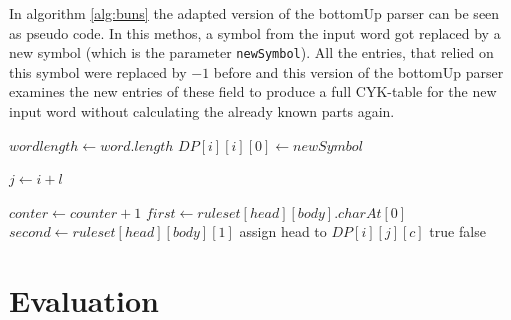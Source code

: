 \documentclass[a4paper, 11pt]{article}
\begin{document}
In algorithm \ref{alg:buns} the adapted version of the bottomUp parser can be seen as pseudo code. In this methos, a symbol from the input word got replaced by a new symbol (which is the parameter \texttt{newSymbol}). All the entries, that relied on this symbol were replaced by $-1$ before and this version of the bottomUp parser examines the new entries of these field to produce a full CYK-table for the new input word without calculating the already known parts again.


\begin{center}
	\label{alg:buns}
	\begin{algorithmic}[1]
		\State $wordlength \gets word.length$ 
		\State $DP[i][i][0] \gets newSymbol$
		\EndIf
		\EndFor
		
		\State $j \gets i + l$
		
		\State $conter \gets counter + 1$
		\State $first \gets ruleset[head][body].charAt[0]$
		\State $second \gets ruleset[head][body][1]$
		\State assign head to $DP[i][j][c]$
		\EndIf
		\EndIf
		\EndFor
		\EndFor
		\EndFor
		\EndIf
		\EndFor
		\EndFor
		\State \Return true
		\EndIf
		\State \Return false
	\end{algorithmic}
	\hrulefill
\end{center}















\section{Evaluation}
\label{evaluation}
\end{document}
